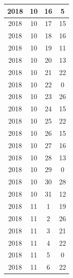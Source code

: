 \begin{longtable} {|c|c|c|c|}
\hline
2018         & 10           & 16           & 5                         \\ 
\hline
2018         & 10           & 17           & 15                        \\ 
\hline
2018         & 10           & 18           & 16                        \\ 
\hline
2018         & 10           & 19           & 11                        \\ 
\hline
2018         & 10           & 20           & 13                        \\ 
\hline
2018         & 10           & 21           & 22                        \\ 
\hline
2018         & 10           & 22           & 0                         \\ 
\hline
2018         & 10           & 23           & 26                        \\ 
\hline
2018         & 10           & 24           & 15                        \\ 
\hline
2018         & 10           & 25           & 22                        \\ 
\hline
2018         & 10           & 26           & 15                        \\ 
\hline
2018         & 10           & 27           & 16                        \\ 
\hline
2018         & 10           & 28           & 13                        \\ 
\hline
2018         & 10           & 29           & 0                         \\ 
\hline
2018         & 10           & 30           & 28                        \\ 
\hline
2018         & 10           & 31           & 12                        \\ 
\hline
2018         & 11           & 1            & 19                        \\ 
\hline
2018         & 11           & 2            & 26                        \\ 
\hline
2018         & 11           & 3            & 21                        \\ 
\hline
2018         & 11           & 4            & 22                        \\ 
\hline
2018         & 11           & 5            & 0                         \\ 
\hline
2018         & 11           & 6            & 22                        \\ 

\end{longtable}
